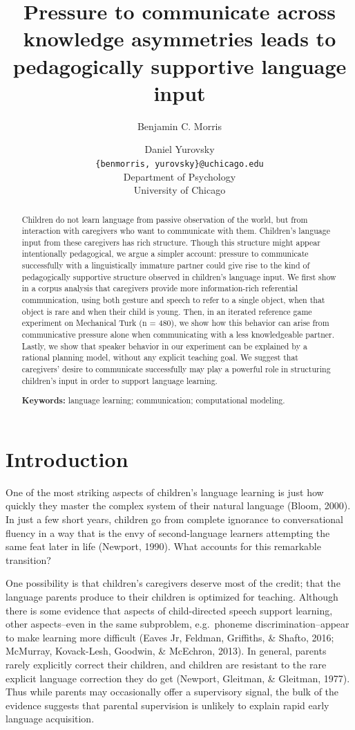 \documentclass[10pt, letterpaper]{article}
\title{Pressure to communicate across knowledge asymmetries leads to
pedagogically supportive language input}
\author{Benjamin C. Morris \and Daniel Yurovsky \\
        \texttt{\{benmorris, yurovsky\}@uchicago.edu} \\
       Department of Psychology \\ University of Chicago}
\begin{document}
\maketitle

\begin{abstract}
Children do not learn language from passive observation of the world,
but from interaction with caregivers who want to communicate with them.
Children's language input from these caregivers has rich structure.
Though this structure might appear intentionally pedagogical, we argue a
simpler account: pressure to communicate successfully with a
linguistically immature partner could give rise to the kind of
pedagogically supportive structure observed in children's language
input. We first show in a corpus analysis that caregivers provide more
information-rich referential communication, using both gesture and
speech to refer to a single object, when that object is rare and when
their child is young. Then, in an iterated reference game experiment on
Mechanical Turk (n = 480), we show how this behavior can arise from
communicative pressure alone when communicating with a less
knowledgeable partner. Lastly, we show that speaker behavior in our
experiment can be explained by a rational planning model, without any
explicit teaching goal. We suggest that caregivers' desire to
communicate successfully may play a powerful role in structuring
children's input in order to support language learning.

\textbf{Keywords:}
language learning; communication; computational modeling.
\end{abstract}

\section{Introduction}\label{introduction}

One of the most striking aspects of children's language learning is just
how quickly they master the complex system of their natural language
(Bloom, 2000). In just a few short years, children go from complete
ignorance to conversational fluency in a way that is the envy of
second-language learners attempting the same feat later in life
(Newport, 1990). What accounts for this remarkable transition?

One possibility is that children's caregivers deserve most of the
credit; that the language parents produce to their children is optimized
for teaching. Although there is some evidence that aspects of
child-directed speech support learning, other aspects--even in the same
subproblem, e.g.~phoneme discrimination--appear to make learning more
difficult (Eaves Jr, Feldman, Griffiths, \& Shafto, 2016; McMurray,
Kovack-Lesh, Goodwin, \& McEchron, 2013). In general, parents rarely
explicitly correct their children, and children are resistant to the
rare explicit language correction they do get (Newport, Gleitman, \&
Gleitman, 1977). Thus while parents may occasionally offer a supervisory
signal, the bulk of the evidence suggests that parental supervision is
unlikely to explain rapid early language acquisition.
\end{document}
